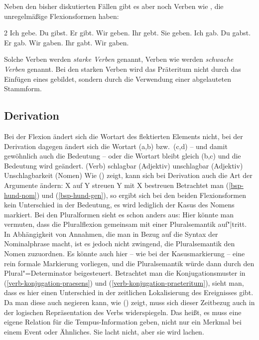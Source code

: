 Neben den bisher diskutierten Fällen gibt es aber noch Verben wie , die unregelmäßige
Flexionsformen haben:
\begin{multicols}{2}
\eal
\ex Ich gebe.   
\ex Du  gibst.  
\ex Er  gibt.   
\ex Wir geben.  
\ex Ihr gebt.   
\ex Sie geben. 
\zl
\eal
\ex Ich gab.
\ex Du  gabst.
\ex Er  gab.
\ex Wir gaben.
\ex Ihr gabt.
\ex Wir gaben. 
\zl
\end{multicols}
\noindent
Solche Verben werden \emph{starke Verben} genannt,
Verben wie  werden \emph{schwache Verben} genannt.
Bei den starken Verben wird das Präteritum nicht durch das Einfügen eines  gebildet,
sondern durch die Verwendung einer abgelauteten Stammform.


\subsection{Derivation}
\label{sec-phen-derivation}

Bei der Flexion ändert sich die Wortart des flektierten Elements nicht, 
bei der Derivation dagegen ändert sich die Wortart (a,b) bzw.\ (c,d) -- und damit
gewöhnlich auch die Bedeutung -- oder die Wortart bleibt gleich (b,c) und die Bedeutung wird geändert.
\eal
\ex {} (Verb)
\ex schlagbar (Adjektiv)
\ex unschlagbar (Adjektiv)
\ex Unschlagbarkeit (Nomen)
\zl
Wie () zeigt, kann sich bei Derivation auch die Art der Argumente ändern:
\eal
\ex X auf Y streuen 
\ex Y mit X bestreuen
\zl
Betrachtet man (\ref{bsp-hund-nom}) und (\ref{bsp-hund-gen}), so ergibt sich bei den beiden
Flexionsformen kein Unterschied in der Bedeutung, es wird lediglich der Kasus des Nomens
markiert. Bei den Pluralformen sieht es schon anders aus: Hier könnte man vermuten,
dass die Pluralflexion gemeinsam mit einer Pluralsemantik auf"|tritt. In Abhängigkeit von
Annahmen, die man in Bezug auf die Syntax der Nominalphrase macht, ist es jedoch
nicht zwingend, die Pluralsemantik den Nomen zuzuordnen. Es könnte auch hier -- wie bei der Kasusmarkierung --
eine rein formale Markierung vorliegen, und die Pluralsemantik würde dann durch den Plural"=Determinator beigesteuert.
Betrachtet man die Konjugationsmuster in (\ref{verb-konjugation-praesens}) und (\ref{verb-konjugation-praeteritum}),
sieht man, dass es hier einen Unterschied in der zeitlichen Lokalisierung des Ereignisses gibt.
Da man diese auch negieren kann, wie () zeigt, muss sich dieser Zeitbezug auch in der
logischen Repräsentation des Verbs widerspiegeln. Das heißt, es muss eine eigene Relation für die
Tempus-Information geben, nicht nur ein Merkmal bei einem Event oder Ähnliches. 
\ea
Sie lacht nicht, aber sie wird lachen.
\z

